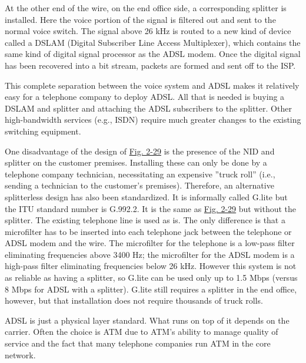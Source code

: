\documentclass[b5paper,11pt]{memoir}
\begin{document}

At the other end of the wire, on the end office side, a corresponding
splitter is installed. Here the voice portion of the signal is filtered
out and sent to the normal voice switch. The signal above 26 kHz is
routed to a new kind of device called a {DSLAM} ({Digital Subscriber
Line Access Multiplexer}), which contains the same kind of digital
signal processor as the ADSL modem. Once the digital signal has been
recovered into a bit stream, packets are formed and sent off to the ISP.

This complete separation between the voice system and ADSL makes it
relatively easy for a telephone company to deploy ADSL. All that is
needed is buying a DSLAM and splitter and attaching the ADSL subscribers
to the splitter. Other high-bandwidth services (e.g., ISDN) require much
greater changes to the existing switching equipment.

One disadvantage of the design of
\protect\hyperlink{0130661023_ch02lev1sec5.htmlux5cux23ch02fig29}{Fig.
2-29} is the presence of the NID and splitter on the customer premises.
Installing these can only be done by a telephone company technician,
necessitating an expensive ''truck roll'' (i.e., sending a technician to
the customer's premises). Therefore, an alternative splitterless design
has also been standardized. It is informally called G.lite but the ITU
standard number is G.992.2. It is the same as
\protect\hyperlink{0130661023_ch02lev1sec5.htmlux5cux23ch02fig29}{Fig.
2-29} but without the splitter. The existing telephone line is used as
is. The only difference is that a microfilter has to be inserted into
each telephone jack between the telephone or ADSL modem and the wire.
The microfilter for the telephone is a low-pass filter eliminating
frequencies above 3400 Hz; the microfilter for the ADSL modem is a
high-pass filter eliminating frequencies below 26 kHz. However this
system is not as reliable as having a splitter, so G.lite can be used
only up to 1.5 Mbps (versus 8 Mbps for ADSL with a splitter). G.lite
still requires a splitter in the end office, however, but that
installation does not require thousands of truck rolls.

ADSL is just a physical layer standard. What runs on top of it depends
on the carrier. Often the choice is ATM due to ATM's ability to manage
quality of service and the fact that many telephone companies run ATM in
the core network.

\protect\hypertarget{0130661023_ch02lev1sec5.htmlux5cux23ch02lev3sec11}{}{}
\end{document}
